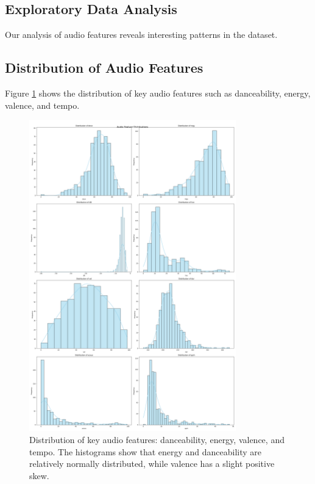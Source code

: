 \documentclass[runningheads]{llncs}
\begin{document}
\subsection{Exploratory Data Analysis}

Our analysis of audio features reveals interesting patterns in the dataset.

\subsection{Distribution of Audio Features}

Figure \ref{fig:audio_features} shows the distribution of key audio features such as danceability, energy, valence, and tempo.

\begin{figure}[h]
    \centering
    \includegraphics[width=0.8\textwidth]{audio_feature_distribution.png}
    \caption{Distribution of key audio features: danceability, energy, valence, and tempo. The histograms show that energy and danceability are relatively normally distributed, while valence has a slight positive skew.}
    \label{fig:audio_features}
\end{figure}
\end{document}
